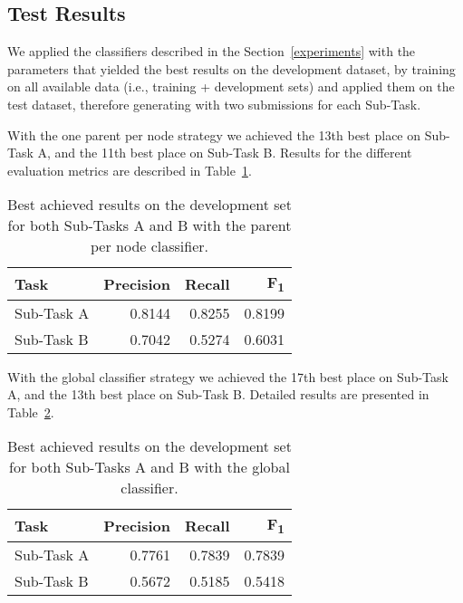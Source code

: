 \documentclass[11pt,a4paper]{article}
\begin{document}
\subsection{Test Results}

We applied the classifiers described in the Section~\ref{experiments} with the
parameters that yielded the best results on the development dataset, by training
on all available data (i.e., training + development sets) and applied them
on the test dataset, therefore generating with two submissions for each Sub-Task.

With the one parent per node strategy we achieved the 13th best place on Sub-Task A,
and the 11th best place on Sub-Task B. Results for the different evaluation metrics
are described in Table~\ref{local_devset-results}.

\begin{table}[!h]
\begin{center}
\begin{tabular}{|l|r|r|r|}
\hline\centering\textbf{Task}  & \textbf{Precision} &  \textbf{Recall} &  \textbf{F\textsubscript{1}}\\
\hline
 Sub-Task A   &  0.8144 & 0.8255 & 0.8199 \\
 Sub-Task B   &  0.7042 & 0.5274 & 0.6031 \\
\hline
\end{tabular}
\end{center}
\caption{\label{local_devset-results} Best achieved results on the development
          set for both Sub-Tasks A and B with the parent per node classifier.}
\end{table}

With the global classifier strategy we achieved the 17th best place on Sub-Task A,
and the 13th best place on Sub-Task B. Detailed results are presented in
Table~\ref{global_devset-results}.

\begin{table}[!h]
\begin{center}
\begin{tabular}{|l|r|r|r|}
\hline\centering\textbf{Task}  & \textbf{Precision} &  \textbf{Recall} &  \textbf{F\textsubscript{1}}\\
\hline
 Sub-Task A   &  0.7761 & 0.7839 & 0.7839 \\
 Sub-Task B   &  0.5672 & 0.5185 & 0.5418 \\
\hline
\end{tabular}
\end{center}
\caption{\label{global_devset-results} Best achieved results on the development
          set for both Sub-Tasks A and B with the global classifier.}
\end{table}
\end{document}
